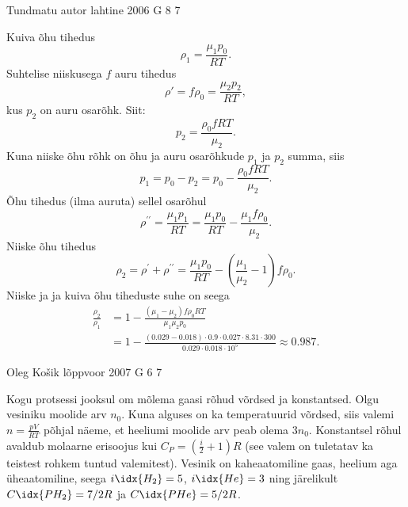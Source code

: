 \documentclass[11pt]{article}
\begin{document}
{%
{Tundmatu autor} %
{lahtine} %
{2006} %
{G 8} %
{7} %
{

\ifSolution
Kuiva õhu tihedus
\[
\rho_1 = \frac{\mu_1p_0}{RT}.
\]
Suhtelise niiskusega $f$ auru tihedus
\[
\rho' = f \rho_0 = \frac{\mu_2p_2}{RT},
\]
kus $p_2$ on auru osarõhk. Siit:
\[
p_2 = \frac{\rho_0fRT}{\mu_2}.
\]
Kuna niiske õhu rõhk on õhu ja auru osarõhkude $p_1$ ja $p_2$ summa, siis
\[
p_1 = p_0 - p_2 = p_0 - \frac{\rho_0fRT}{\mu_2}.
\]
Õhu tihedus (ilma auruta) sellel osarõhul
\[
\rho^{\prime \prime}=\frac{\mu_{1} p_{1}}{R T}=\frac{\mu_{1} p_{0}}{R T}-\frac{\mu_{1} f \rho_{0}}{\mu_{2}}.
\]
Niiske õhu tihedus
\[
\rho_{2}=\rho^{\prime}+\rho^{\prime \prime}=\frac{\mu_{1} p_{0}}{R T}-\left(\frac{\mu_{1}}{\mu_{2}}-1\right) f \rho_{0}.
\]
Niiske ja ja kuiva õhu tiheduste suhe on seega
\[
\begin{aligned}
\frac{\rho_{2}}{\rho_{1}}&=1-\frac{\left(\mu_{1}-\mu_{2}\right) f \rho_{0} R T}{\mu_{1} \mu_{2} p_{0}} \\ 
&=1-\frac{(\num{0,029}-\num{0,018}) \cdot \num{0,9} \cdot \num{0,027} \cdot \num{8,31} \cdot 300}{\num{0,029} \cdot \num{0,018} \cdot 10^{5}} \approx \num{0,987}.
\end{aligned}
\]
\fi
}

{Oleg Košik} %
{lõppvoor} %
{2007} %
{G 6} %
{7} %
{

\ifSolution
Kogu protsessi jooksul om mõlema gaasi rõhud võrdsed ja konstantsed. Olgu vesiniku moolide arv $n_0$. Kuna alguses on ka temperatuurid võrdsed, siis valemi $n = \frac{pV}{RT}$ põhjal näeme, et heeliumi moolide arv peab olema $3n_0$. Konstantsel rõhul avaldub molaarne erisoojus kui $C_P = \left(\frac{i}{2} + 1\right) R$ (see valem on tuletatav ka teistest rohkem tuntud valemitest). Vesinik on kaheaatomiline gaas, heelium aga üheaatomiline, seega $i\idx{H_2} = 5$, $i\idx{He} = 3$ ning järelikult $C\idx{PH_2} = 7/2R$ ja $C\idx{PHe} = 5/2R$.

}}
\end{document}
